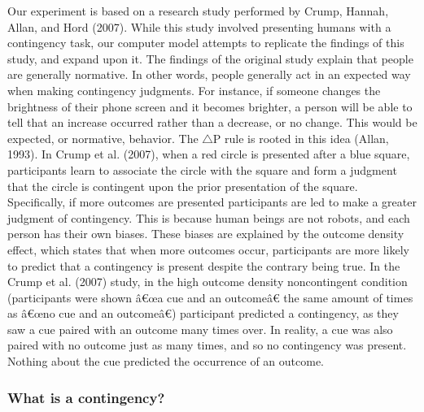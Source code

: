 \documentclass[
  english,
  man,floatsintext]{apa6}
\begin{document}
Our experiment is based on a research study performed by Crump, Hannah, Allan, and Hord (2007). While this study involved presenting humans with a contingency task, our computer model attempts to replicate the findings of this study, and expand upon it. The findings of the original study explain that people are generally normative. In other words, people generally act in an expected way when making contingency judgments. For instance, if someone changes the brightness of their phone screen and it becomes brighter, a person will be able to tell that an increase occurred rather than a decrease, or no change. This would be expected, or normative, behavior. The \(\triangle\)P rule is rooted in this idea (Allan, 1993). In Crump et al. (2007), when a red circle is presented after a blue square, participants learn to associate the circle with the square and form a judgment that the circle is contingent upon the prior presentation of the square. Specifically, if more outcomes are presented participants are led to make a greater judgment of contingency. This is because human beings are not robots, and each person has their own biases. These biases are explained by the outcome density effect, which states that when more outcomes occur, participants are more likely to predict that a contingency is present despite the contrary being true. In the Crump et al. (2007) study, in the high outcome density noncontingent condition (participants were shown â€œa cue and an outcomeâ€ the same amount of times as â€œno cue and an outcomeâ€) participant predicted a contingency, as they saw a cue paired with an outcome many times over. In reality, a cue was also paired with no outcome just as many times, and so no contingency was present. Nothing about the cue predicted the occurrence of an outcome.

\hypertarget{what-is-a-contingency}{%
\subsubsection{What is a contingency?}\label{what-is-a-contingency}}
\end{document}
